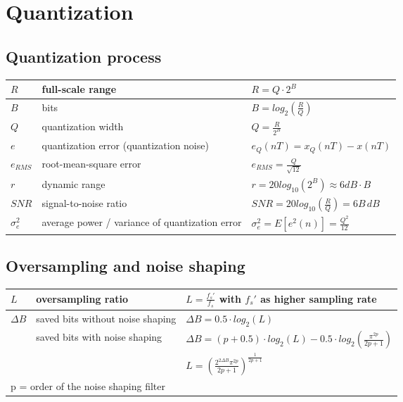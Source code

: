 \section{Quantization}

\subsection{Quantization process}
\begin{tabularx}{\textwidth}{|l|X|X|}
	\hline
	$R$			& full-scale range		& $R = Q \cdot 2^B$
	\\ \hline
	$B$			& bits					& $B = log_2 \left(\frac{R}{Q}\right)$
	\\ \hline
	$Q$			& quantization width	& $Q = \frac{R}{2^B}$
	\\ \hline
	$e$			& quantization error (quantization noise)	& $e_Q(nT) = x_Q(nT) -x(nT)$
	\\ \hline
	$e_{RMS}$	& root-mean-square error & $e_{RMS} = \frac{Q}{\sqrt{12}}$
	\\ \hline
	$r$	        & dynamic range         & $r = 20 log_{10}\left(2^B\right) \approx 6dB \cdot B$
	\\ \hline
	$SNR$		& signal-to-noise ratio	& $SNR = 20 log_{10}\left(\frac{R}{Q}\right) = 6B\, dB$
	\\ \hline
	$\sigma_e^2$& average power / variance of quantization error & $\sigma_e^2 = E[e^2(n)] = \frac{Q^2}{12}$
	\\ \hline
\end{tabularx}


\subsection{Oversampling and noise shaping}
\begin{tabularx}{0.75\textwidth}{|l|l|X|}
	\hline
	$L$	& oversampling ratio	& $L = \frac{f_s'}{f_s}$ with $f_s'$ as higher sampling rate
	\\ \hline
	$\Delta B$	& saved bits without noise shaping	& $\Delta B = 0.5 \cdot log_2(L)$ \\
				& saved bits with noise shaping		& $\Delta B = (p + 0.5) \cdot log_2(L) - 0.5 \cdot log_2\left(\frac{\pi^{2p}}{2p + 1}\right)$ \\
				& & $L = \left(\frac{2^{2\Delta B} \pi^{2p}}{2p+1}\right)^{\frac{1}{2p+1}}$	
	\\ \hline
	\multicolumn{3}{l}{p = order of the noise shaping filter}
\end{tabularx}

